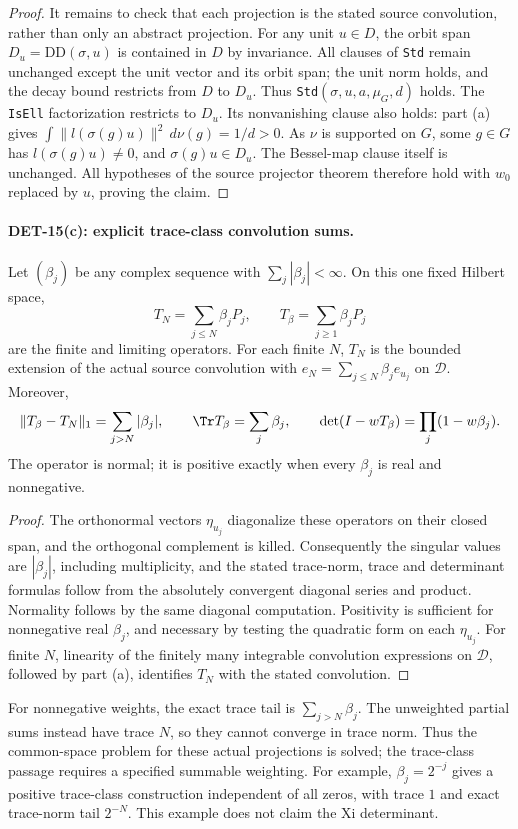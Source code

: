 \begin{proof}
It remains to check that each projection is the stated source
convolution, rather than only an abstract projection. For any unit
\(u\in D\), the orbit span \(D_u=\mathrm{DD}(\sigma,u)\) is
contained in \(D\) by invariance. All clauses of \texttt{Std}
remain unchanged except the unit vector and its orbit span;
the unit norm holds, and the decay bound restricts from \(D\)
to \(D_u\). Thus \texttt{Std}\((\sigma,u,a,\mu_G,d)\) holds.
The \texttt{IsEll} factorization restricts to \(D_u\).
Its nonvanishing clause also holds: part (a) gives
\(\int\|l(\sigma(g)u)\|^2\,d\nu(g)=1/d>0\).
As \(\nu\) is supported on \(G\), some \(g\in G\) has
\(l(\sigma(g)u)\ne0\), and \(\sigma(g)u\in D_u\).
The Bessel-map clause itself is unchanged.
All hypotheses of the source projector theorem therefore hold
with \(w_0\) replaced by \(u\), proving the claim.
\end{proof}

\paragraph{DET-15(c): explicit trace-class convolution sums.}
Let \((\beta_j)\) be any complex sequence with
\(\sum_j|\beta_j|<\infty\). On this one fixed Hilbert space,
\[
 T_N=\sum_{j\le N}\beta_jP_j,\qquad
 T_\beta=\sum_{j\ge1}\beta_jP_j
\]
are the finite and limiting operators. For each finite \(N\),
\(T_N\) is the bounded extension of the actual source convolution
with \(e_N=\sum_{j\le N}\beta_j e_{u_j}\) on \(\mathcal D\).
Moreover,
\[
 \|T_\beta-T_N\|_1=\sum_{j>N}|\beta_j|,\qquad
 \Tr T_\beta=\sum_j\beta_j,\qquad
 \det(I-wT_\beta)=\prod_j(1-w\beta_j).
\]
The operator is normal; it is positive exactly when every
\(\beta_j\) is real and nonnegative.
\begin{proof}
The orthonormal vectors \(\eta_{u_j}\) diagonalize these operators
on their closed span, and the orthogonal complement is killed.
Consequently the singular values are \(|\beta_j|\), including
multiplicity, and the stated trace-norm, trace and determinant
formulas follow from the absolutely convergent diagonal series
and product. Normality follows by the same diagonal computation.
Positivity is sufficient for nonnegative real \(\beta_j\), and
necessary by testing the quadratic form on each \(\eta_{u_j}\).
For finite \(N\), linearity of the finitely many integrable
convolution expressions on \(\mathcal D\), followed by part (a),
identifies \(T_N\) with the stated convolution.
\end{proof}
For nonnegative weights, the exact trace tail is \(\sum_{j>N}\beta_j\).
The unweighted partial sums instead have trace \(N\), so they
cannot converge in trace norm. Thus the common-space problem for
these actual projections is solved; the trace-class passage
requires a specified summable weighting.
For example, \(\beta_j=2^{-j}\) gives a positive trace-class
construction independent of all zeros, with trace \(1\) and
exact trace-norm tail \(2^{-N}\). This example does not claim
the Xi determinant.

